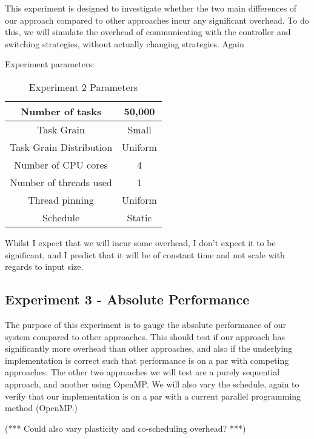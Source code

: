 This experiment is designed to investigate whether the two main differences of our approach compared to other approaches incur any significant overhead. To do this, we will simulate the overhead of communicating with the controller and switching strategies, without actually changing strategies. Again



Experiment parameters:

\begin{table}
\centering
	\begin{tabular}{|c|c|}
		\hline
		Number of tasks & 50,000 \\
		\hline
		Task Grain & Small \\
		\hline
		Task Grain Distribution & Uniform \\
		\hline
		Number of CPU cores & 4 \\
		\hline
		Number of threads used & 1 \\
		\hline
		Thread pinning & Uniform \\
		\hline
		Schedule & Static \\
		\hline
	\end{tabular}
\caption{Experiment 2 Parameters}
\label{table:ex2_parameters}
\end{table}



Whilst I expect that we will incur some overhead, I don't expect it to be significant, and I predict that it will be of constant time and not scale with regards to input size.



\subsection{Experiment 3 - Absolute Performance}

The purpose of this experiment is to gauge the absolute performance of our system compared to other approaches. This should test if our approach has significantly more overhead than other approaches, and also if the underlying implementation is correct such that performance is on a par with competing approaches. The other two approaches we will test are a purely sequential approach, and another using OpenMP. We will also vary the schedule, again to verify that our implementation is on a par with a current parallel programming method (OpenMP.)

(*** Could also vary plasticity and co-scheduling overhead? ***)



